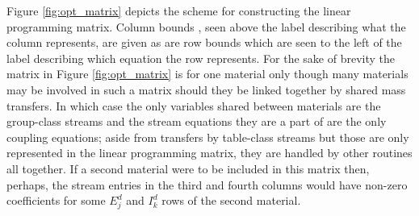 Figure \ref{fig:opt_matrix}
depicts the scheme for constructing the linear programming matrix. Column bounds
, seen above the label describing what the column represents, are given as
are row bounds which are seen to the left of the label describing which equation
the row represents. For the sake of brevity
the matrix in Figure \ref{fig:opt_matrix} is for one material only though many
materials may be involved in such a matrix should they be linked together
by shared mass transfers. In which case the only variables shared between materials are the
group-class streams and the stream equations they are a part of are the only
coupling equations; aside from transfers by table-class streams but those
are only represented in the linear programming matrix, they are handled by
other routines all together. If a second material were to be included in this
matrix then, perhaps, the stream entries in the third and fourth columns would
have non-zero coefficients for some $E_{j}^{d}$ and $I_{k}^{d}$ rows of the 
second material.

